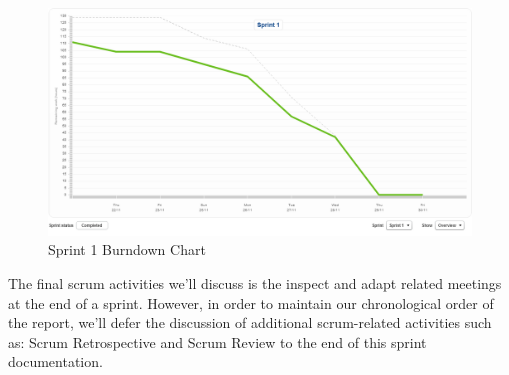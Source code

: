 \begin{figure}[H]
  \includegraphics[width=\textwidth,natwidth=1253,natheight=673]{illustrations/burndown.png}
  \caption{Sprint 1 Burndown Chart}
  \label{sprint1burnchart}
\end{figure}
The final scrum activities we’ll discuss is the inspect and adapt related meetings at the end of a sprint. However, in order to maintain our chronological order of the report, we’ll defer the discussion of additional scrum-related activities such as: Scrum Retrospective and Scrum Review to the end of this sprint documentation.\\
\newpage
